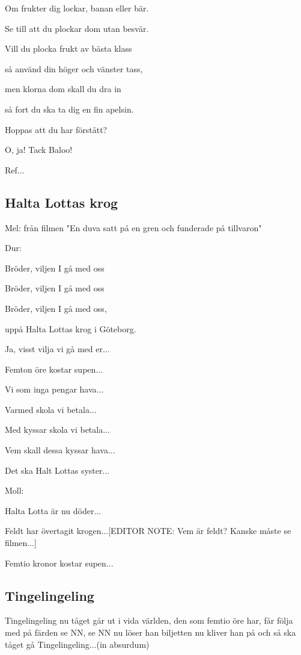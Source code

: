 Om frukter dig lockar, banan eller bär.

Se till att du plockar dom utan besvär.

Vill du plocka frukt av bästa klass

så använd din höger och vänster tass,

men klorna dom skall du dra in

så fort du ska ta dig en fin apelsin.

Hoppas att du har förstått?

O, ja! Tack Baloo!\bigskip


Ref...\bigskip


\subsection{\textbf{Halta Lottas krog}}

Mel: från filmen "En duva satt på en gren och funderade på tillvaron"\bigskip

Dur:

Bröder, viljen I gå med oss

Bröder, viljen I gå med oss

Bröder, viljen I gå med oss,

uppå Halta Lottas krog i Göteborg. \bigskip

Ja, visst vilja vi gå med er...\bigskip

Femton öre kostar supen...\bigskip

Vi som inga pengar hava...\bigskip

Varmed skola vi betala...\bigskip

Med kyssar skola vi betala...\bigskip

Vem skall dessa kyssar hava...\bigskip

Det ska Halt Lottas syster... \bigskip

Moll:

Halta Lotta är nu döder...\bigskip

Feldt har övertagit krogen...[EDITOR NOTE: Vem är feldt? Kanske måste se filmen...]\bigskip 

Femtio kronor kostar supen...\bigskip

\subsection{\textbf{Tingelingeling}}

Tingelingeling nu tåget går
ut i vida världen,
den som femtio öre har,
får följa med på färden
se NN, se NN
nu löser han biljetten
nu kliver han på
och så ska tåget gå
Tingelingeling...(in absurdum)

